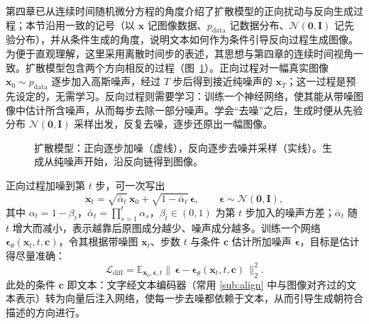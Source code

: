 第四章已从连续时间随机微分方程的角度介绍了扩散模型的正向扰动与反向生成过程；本节沿用一致的记号（以 $\mathbf{x}$ 记图像数据、$p_{\mathrm{data}}$ 记数据分布、$\mathcal{N}(\mathbf{0},\mathbf{I})$ 记先验分布），并从条件生成的角度，说明文本如何作为条件引导反向过程生成图像。为便于直观理解，这里采用离散时间步的表述，其思想与第四章的连续时间视角一致。扩散模型包含两个方向相反的过程（图~\ref{fig:diffusion}）。正向过程对一幅真实图像 $\mathbf{x}_0\sim p_{\mathrm{data}}$ 逐步加入高斯噪声，经过 $T$ 步后得到接近纯噪声的 $\mathbf{x}_T$；这一过程是预先设定的，无需学习。反向过程则需要学习：训练一个神经网络，使其能从带噪图像中估计所含噪声，从而每步去除一部分噪声。学会“去噪”之后，生成时便从先验分布 $\mathcal{N}(\mathbf{0},\mathbf{I})$ 采样出发，反复去噪，逐步还原出一幅图像。

\begin{figure}[htbp]
  \centering
  \caption{扩散模型：正向逐步加噪（虚线），反向逐步去噪并采样（实线）。生成从纯噪声开始，沿反向链得到图像。}
  \label{fig:diffusion}
\end{figure}

正向过程加噪到第 $t$ 步，可一次写出
\begin{equation}
  \mathbf{x}_t=\sqrt{\bar\alpha_t}\,\mathbf{x}_0+\sqrt{1-\bar\alpha_t}\,\boldsymbol{\epsilon},\qquad \boldsymbol{\epsilon}\sim\mathcal{N}(\mathbf{0},\mathbf{I}),
\end{equation}
其中 $\alpha_t=1-\beta_t$，$\bar\alpha_t=\prod_{s=1}^{t}\alpha_s$，$\beta_t\in(0,1)$ 为第 $t$ 步加入的噪声方差；$\bar\alpha_t$ 随 $t$ 增大而减小，表示越靠后原图成分越少、噪声成分越多。训练一个网络 $\boldsymbol{\epsilon}_\theta(\mathbf{x}_t,t,\mathbf{c})$，令其根据带噪图 $\mathbf{x}_t$、步数 $t$ 与条件 $\mathbf{c}$ 估计所加噪声 $\boldsymbol{\epsilon}$，目标是估计得尽量准确：
\begin{equation}
  \mathcal{L}_{\text{diff}}=\mathbb{E}_{\mathbf{x}_0,\boldsymbol{\epsilon},t}\big\lVert\,\boldsymbol{\epsilon}-\boldsymbol{\epsilon}_\theta(\mathbf{x}_t,t,\mathbf{c})\,\big\rVert_2^2 .
\end{equation}
此处的条件 $\mathbf{c}$ 即文本：文字经文本编码器（常用 \ref{sub:align} 中与图像对齐过的文本表示）转为向量后注入网络，使每一步去噪都依赖于文本，从而引导生成朝符合描述的方向进行。

